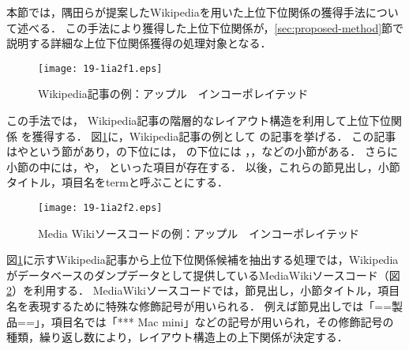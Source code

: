 \documentclass[japanese]{jnlp_1.4}
\newcommand{\xmp}[1]{}
\begin{document}
本節では，隅田らが提案したWikipediaを用いた上位下位関係の獲得手法\cite{隅田:吉永:鳥澤:2009}について述べる．
この手法により獲得した上位下位関係が，\ref{sec:proposed-method}節で説明する詳細な上位下位関係獲得の処理対象となる．

\begin{figure}[b]
\begin{center}
\texttt{[image: 19-1ia2f1.eps]}
\end{center}
\caption{Wikipedia記事の例：アップル　インコーポレイテッド}
\label{fig:wikip-article}
\end{figure}

この手法では，
Wikipedia記事の階層的なレイアウト構造を利用して上位下位関係
を獲得する．
図\ref{fig:wikip-article}に，Wikipedia記事の例として\xmp{アップル　インコーポレイテッド}
の記事を挙げる．
この記事は\xmp{Appleショップ}や\xmp{製品}という節があり，\xmp{Appleショップ}の下位には\xmp{北海道地方}，
\xmp{製品}の下位には
\xmp{コンピュータ}，\xmp{iPod}，\xmp{iPhone}などの小節がある．
さらに小節の中には，\xmp{Mac mini}や\xmp{MacBook}，
\xmp{MacBook Air}といった項目が存在する．
以後，これらの節見出し，小節タイトル，項目名をtermと呼ぶことにする．

\begin{figure}[b]
\begin{center}
\texttt{[image: 19-1ia2f2.eps]}
\end{center}
\caption{Media Wikiソースコードの例：アップル　インコーポレイテッド}
\label{fig:mediawiki}
\end{figure}

図\ref{fig:wikip-article}に示すWikipedia記事から上位下位関係候補を抽出する処理では，Wikipediaがデータベースのダンプデータとして提供しているMediaWikiソースコード（図\ref{fig:mediawiki}）を利用する．
MediaWikiソースコードでは，節見出し，小節タイトル，項目名を表現するために特殊な修飾記号が用いられる．
例えば節見出しでは「==製品==」，項目名では「*** Mac mini」などの記号が用いられ，その修飾記号の種類，繰り返し数により，レイアウト構造上の上下関係が決定する．
\end{document}
